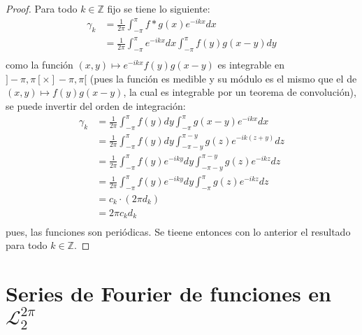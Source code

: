 \documentclass[12pt]{report}
\theoremstyle{largebreak}
\begin{document}
    \begin{proof}
        Para todo $k\in\mathbb{Z}$ fijo se tiene lo siguiente:
        \begin{equation*}
            \begin{split}
                \gamma_k&=\frac{1}{2\pi}\int_{-\pi}^\pi f*g(x)e^{ -ikx}dx\\
                &=\frac{1}{2\pi}\int_{-\pi}^\pi e^{ -ikx}dx\int_{-\pi}^\pi f(y)g(x-y)dy\\
            \end{split}
        \end{equation*}
        como la función $(x,y)\mapsto e^{ -ikx}f(y)g(x-y)$ es integrable en $]-\pi,\pi[\times]-\pi,\pi[$ (pues la función es medible y su módulo es el mismo que el de $(x,y)\mapsto f(y)g(x-y)$, la cual es integrable por un teorema de convolución), se puede invertir del orden de integración:
        \begin{equation*}
            \begin{split}
                \gamma_k&=\frac{1}{2\pi}\int_{-\pi}^\pi f(y)dy\int_{-\pi}^\pi g(x-y)e^{ -ikx}dx\\
                &=\frac{1}{2\pi}\int_{-\pi}^\pi f(y)dy\int_{-\pi-y}^{\pi-y} g(z)e^{ -ik(z+y)}dz\\
                &=\frac{1}{2\pi}\int_{-\pi}^\pi f(y)e^{ -iky}dy\int_{-\pi-y}^{\pi-y} g(z)e^{ -ikz}dz\\
                &=\frac{1}{2\pi}\int_{-\pi}^\pi f(y)e^{ -iky}dy\int_{-\pi}^{\pi} g(z)e^{ -ikz}dz\\
                &=c_k\cdot\left(2\pi d_k \right)\\
                &=2\pi c_kd_k\\
            \end{split}
        \end{equation*}
        pues, las funciones son periódicas. Se tieene entonces con lo anterior el resultado para todo $k\in\mathbb{Z}$.
    \end{proof}

    \section{Series de Fourier de funciones en $\mathcal{L}_2^{2\pi}$}
\end{document}
